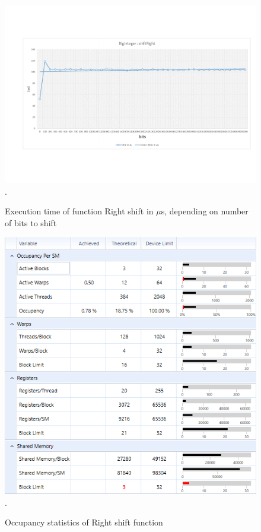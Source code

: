 \documentclass[oneside,openright,12pt,final,en]{mgr}
\begin{document}
\begin{figure}[H]
	\centering
	\includegraphics[width=\textwidth,trim={0.5cm 2.8cm 0.4cm 2.8cm},clip]{rightshift.pdf}.
	\caption{Execution time of function Right shift in $\mu$s, depending on number of bits to shift}
	\label{fig:rightshift}
\end{figure}

\begin{figure}[H]
	\centering
	\includegraphics[width=\textwidth]{rightshift_occupancy}.
	\caption{Occupancy statistics of Right shift function}
	\label{fig:rightshift_occupancy}
\end{figure}
\end{document}
